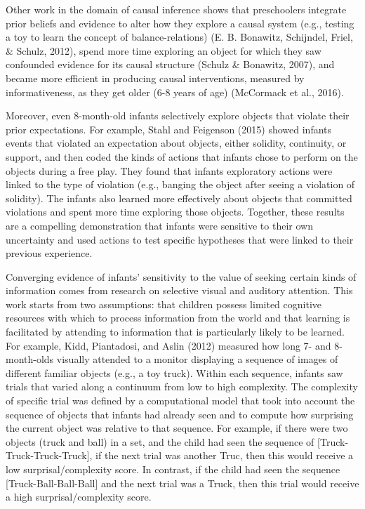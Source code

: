 \documentclass[english,floatsintext,man]{apa6}
\theoremstyle{definition}
\theoremstyle{definition}
\theoremstyle{definition}
\theoremstyle{remark}
\begin{document}
Other work in the domain of causal inference shows that preschoolers
integrate prior beliefs and evidence to alter how they explore a causal
system (e.g., testing a toy to learn the concept of balance-relations)
(E. B. Bonawitz, Schijndel, Friel, \& Schulz, 2012), spend more time
exploring an object for which they saw confounded evidence for its
causal structure (Schulz \& Bonawitz, 2007), and became more efficient
in producing causal interventions, measured by informativeness, as they
get older (6-8 years of age) (McCormack et al., 2016).

Moreover, even 8-month-old infants selectively explore objects that
violate their prior expectations. For example, Stahl and Feigenson
(2015) showed infants events that violated an expectation about objects,
either solidity, continuity, or support, and then coded the kinds of
actions that infants chose to perform on the objects during a free play.
They found that infants exploratory actions were linked to the type of
violation (e.g., banging the object after seeing a violation of
solidity). The infants also learned more effectively about objects that
committed violations and spent more time exploring those objects.
Together, these results are a compelling demonstration that infants were
sensitive to their own uncertainty and used actions to test specific
hypotheses that were linked to their previous experience.

Converging evidence of infants' sensitivity to the value of seeking
certain kinds of information comes from research on selective visual and
auditory attention. This work starts from two assumptions: that children
possess limited cognitive resources with which to process information
from the world and that learning is facilitated by attending to
information that is particularly likely to be learned. For example,
Kidd, Piantadosi, and Aslin (2012) measured how long 7- and 8-month-olds
visually attended to a monitor displaying a sequence of images of
different familiar objects (e.g., a toy truck). Within each sequence,
infants saw trials that varied along a continuum from low to high
complexity. The complexity of specific trial was defined by a
computational model that took into account the sequence of objects that
infants had already seen and to compute how surprising the current
object was relative to that sequence. For example, if there were two
objects (truck and ball) in a set, and the child had seen the sequence
of {[}Truck-Truck-Truck-Truck{]}, if the next trial was another Truc,
then this would receive a low surprisal/complexity score. In contrast,
if the child had seen the sequence {[}Truck-Ball-Ball-Ball{]} and the
next trial was a Truck, then this trial would receive a high
surprisal/complexity score.
\end{document}
